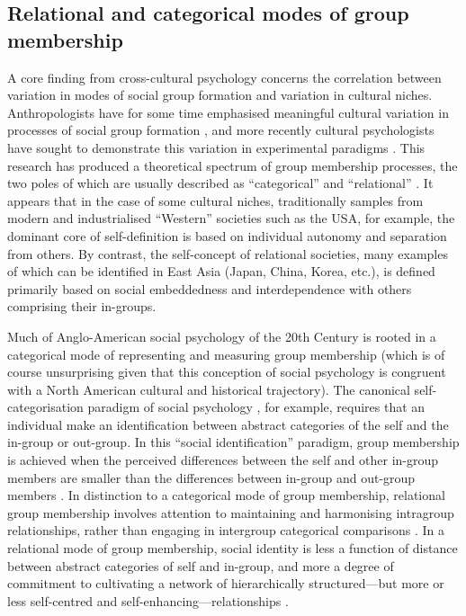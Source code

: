 {\subsection{Relational and categorical modes of group membership}

A core finding from cross-cultural psychology concerns the correlation between variation in modes of social group formation and variation in cultural niches.  Anthropologists have for some time emphasised meaningful cultural variation in processes of social group formation \citep{Strodtbeck1961,Kluckhohn1961,Mead1967,Fei1992}, and more recently cultural psychologists have sought to demonstrate this variation in experimental paradigms \citep{Markus1991,Nisbett2001}.
This research has produced a theoretical spectrum of group membership processes, the two poles of which are usually described as ``categorical'' and ``relational'' \citep{Hofstede1980,Brewer2007}.  It appears that in the case of some cultural niches, traditionally samples from modern and industrialised ``Western'' societies such as the USA, for example, the dominant core of self-definition is based on individual autonomy and separation from others.  By contrast, the self-concept of relational societies, many examples of which can be identified in East Asia (Japan, China, Korea, etc.), is defined primarily based on social embeddedness and interdependence with others comprising their in-groups\citep{Leung2012}.

Much of Anglo-American social psychology of the 20th Century is rooted in a categorical mode of representing and measuring group membership (which is of course unsurprising given that this conception of social psychology is congruent with a North American cultural and historical trajectory).  The canonical self-categorisation paradigm of social psychology \citep{Turner1987}, for example, requires that an individual make an identification between abstract categories of the self and the in-group or out-group. In this ``social identification'' paradigm, group membership is achieved when the perceived differences between the self and other in-group members are smaller than the differences between in-group and out-group members \citep{Yuki2014}.  In distinction to a categorical mode of group membership, relational group membership involves attention to maintaining and harmonising intragroup relationships, rather than engaging in intergroup categorical comparisons \citep{Yuki2003}.  In a relational mode of group membership, social identity is less a function of distance between abstract categories of self and in-group, and more a degree of commitment to cultivating a network of hierarchically structured---but more or less self-centred and self-enhancing---relationships \citep{Liu2009,Nisbett2003}.

}
